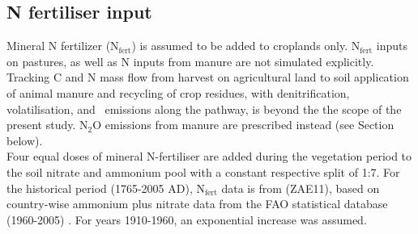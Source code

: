 
\subsection{N fertiliser input}
\label{sec:nfert}
Mineral N fertilizer (N$_{\mathrm{fert}}$) is assumed to be added to croplands only. N$_{\mathrm{fert}}$ inputs on pastures, as well as N inputs from manure are not simulated explicitly. Tracking C and N mass flow from harvest on agricultural land to soil application of animal manure and recycling of crop residues, with denitrification, volatilisation, and \nno\ emissions along the pathway, is beyond the the scope of the present study. N$_2$O emissions from manure are prescribed instead (see Section below).\\

Four equal doses of mineral N-fertiliser are added during the vegetation period to the soil nitrate and ammonium pool with a constant respective split of 1:7. For the historical period (1765-2005 AD), N$_{\mathrm{fert}}$ data is from \citet{zaehle11ngeo} (ZAE11), based on country-wise ammonium plus nitrate data from the FAO statistical database (1960-2005) \citep{fao}. For years 1910-1960, an exponential increase was assumed.\\

